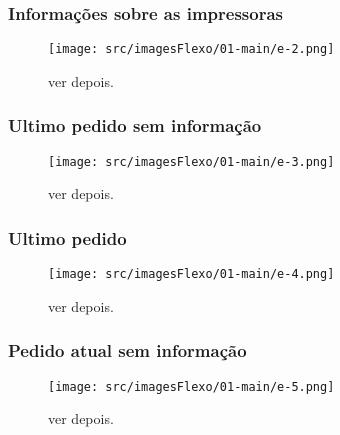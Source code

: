 \newpage
\thispagestyle{fancy}

\vspace*{\fill}

\subsubsection{\small{Informações sobre as impressoras}}


\begin{figure}[h]
    \centering
    \texttt{[image: src/imagesFlexo/01-main/e-2.png]}
    \caption{ver depois.}
    \label{}
\end{figure}

\vspace*{\fill}

\newpage
\thispagestyle{fancy}

\vspace*{\fill}

\subsubsection{\small{Ultimo pedido sem informação}}


\begin{figure}[h]
    \centering
    \texttt{[image: src/imagesFlexo/01-main/e-3.png]}
    \caption{ver depois.}
    \label{}
\end{figure}

\vspace*{\fill}



\newpage
\thispagestyle{fancy}

\vspace*{\fill}

\subsubsection{\small{Ultimo pedido}}


\begin{figure}[h]
    \centering
    \texttt{[image: src/imagesFlexo/01-main/e-4.png]}
    \caption{ver depois.}
    \label{}
\end{figure}

\vspace*{\fill}
\newpage
\thispagestyle{fancy}

\vspace*{\fill}

\subsubsection{\small{Pedido atual sem informação}}

\begin{figure}[h]
    \centering
    \texttt{[image: src/imagesFlexo/01-main/e-5.png]}
    \caption{ver depois.}
    \label{}
\end{figure}

\vspace*{\fill}